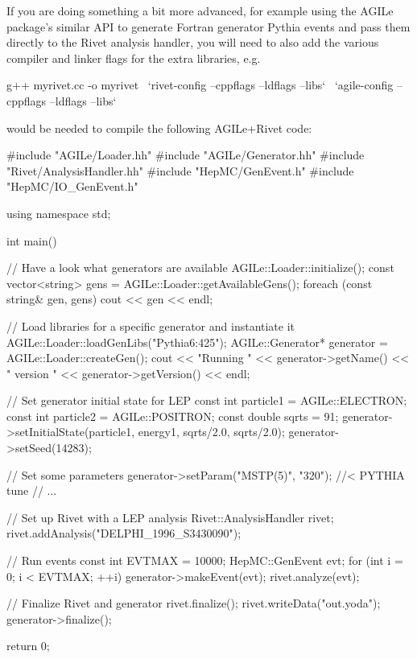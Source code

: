 If you are doing something a bit more advanced, for example using the AGILe
package's similar API to generate Fortran generator Pythia events and pass them
directly to the Rivet analysis handler, you will need to also add the various
compiler and linker flags for the extra libraries, e.g.
%
\begin{snippet}
g++ myrivet.cc -o myrivet \
  `rivet-config --cppflags --ldflags --libs` \
  `agile-config --cppflags --ldflags --libs`
\end{snippet}
%
would be needed to compile the following AGILe+Rivet code:
%
\goodbreak
\begin{snippet}
#include "AGILe/Loader.hh"
#include "AGILe/Generator.hh"
#include "Rivet/AnalysisHandler.hh"
#include "HepMC/GenEvent.h"
#include "HepMC/IO_GenEvent.h"

using namespace std;

int main() {
  // Have a look what generators are available
  AGILe::Loader::initialize();
  const vector<string> gens = AGILe::Loader::getAvailableGens();
  foreach (const string& gen, gens) {
    cout << gen << endl;
  }

  // Load libraries for a specific generator and instantiate it
  AGILe::Loader::loadGenLibs("Pythia6:425");
  AGILe::Generator* generator = AGILe::Loader::createGen();
  cout << "Running " << generator->getName()
       << " version " << generator->getVersion() << endl;

  // Set generator initial state for LEP
  const int particle1 = AGILe::ELECTRON;
  const int particle2 = AGILe::POSITRON;
  const double sqrts = 91;
  generator->setInitialState(particle1, energy1, sqrts/2.0, sqrts/2.0);
  generator->setSeed(14283);

  // Set some parameters
  generator->setParam("MSTP(5)", "320"); //< PYTHIA tune
  // ...

  // Set up Rivet with a LEP analysis
  Rivet::AnalysisHandler rivet;
  rivet.addAnalysis("DELPHI_1996_S3430090");

  // Run events
  const int EVTMAX = 10000;
  HepMC::GenEvent evt;
  for (int i = 0; i < EVTMAX; ++i) {
    generator->makeEvent(evt);
    rivet.analyze(evt);
  }

  // Finalize Rivet and generator
  rivet.finalize();
  rivet.writeData("out.yoda");
  generator->finalize();

  return 0;
}
\end{snippet}


